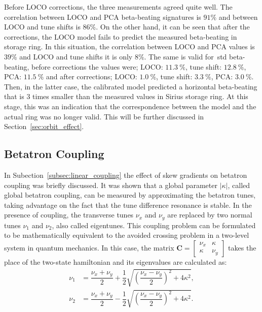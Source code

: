 Before LOCO corrections, the three measurements agreed quite well. The correlation between LOCO and PCA beta-beating signatures is $91\%$ and between LOCO and tune shifts is $86\%$. On the other hand, it can be seen that after the corrections, the LOCO model fails to predict the measured beta-beating in storage ring. In this situation, the correlation between LOCO and PCA values is $39\%$ and LOCO and tune shifts it is only $8\%$. The same is valid for~\gls{std} beta-beating, before corrections the values were; LOCO: $\SI{11.3}{\%}$, tune shift: $\SI{12.8}{\%}$, PCA: $\SI{11.5}{\%}$ and after corrections; LOCO: $\SI{1.0}{\%}$, tune shift: $\SI{3.3}{\%}$, PCA: $\SI{3.0}{\%}$. Then, in the latter case, the calibrated model predicted a horizontal beta-beating that is 3 times smaller than the measured values in Sirius storage ring. At this stage, this was an indication that the correspondence between the model and the actual ring was no longer valid. This will be further discussed in Section~\ref{sec:orbit_effect}.

\subsection{Betatron Coupling}
In Subection~\ref{subsec:linear_coupling} the effect of skew gradients on betatron coupling was briefly discussed. It was shown that a global parameter $|\kappa|$, called global betatron coupling, can be measured by approximating the betatron tunes, taking advantage on the fact that the tune difference resonance is stable. In the presence of coupling, the transverse tunes $\nu_x$ and $\nu_y$ are replaced by two normal tunes $\nu_1$ and $\nu_2$, also called eigentunes. This coupling problem can be formulated to be mathematically equivalent to the avoided crossing problem in a two-level system in quantum mechanics. In this case, the matrix $\mathbf{C} = \begin{bmatrix} \nu_x & \kappa \\ \kappa & \nu_y \end{bmatrix}$ takes the place of the two-state hamiltonian and its eigenvalues are calculated as:
\begin{align}
    \nu_1 &= \dfrac{\nu_x + \nu_y}{2} + \dfrac{1}{2}\sqrt{\left(\dfrac{\nu_x - \nu_y}{2}\right)^2 + 4 \kappa^2}, \\
    \nu_2 &= \dfrac{\nu_x + \nu_y}{2} - \dfrac{1}{2}\sqrt{\left(\dfrac{\nu_x - \nu_y}{2}\right)^2 + 4 \kappa^2}.
    \label{eq:normal_tunes}
\end{align}

